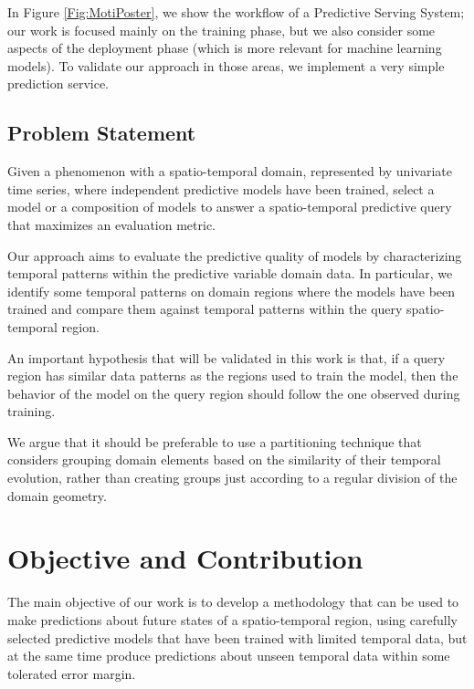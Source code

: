 In Figure \ref{Fig:MotiPoster}, we show the workflow of a Predictive Serving System; our work is focused mainly on the training phase, but we also consider some aspects of the deployment phase (which is more relevant for machine learning models). To validate our approach in those areas, we implement a very simple prediction service.


\subsection{Problem Statement}
\label{Sec:ProblemStatement}

Given a phenomenon with a spatio-temporal domain, represented by univariate time series, where independent predictive models have been trained, select a model or a composition of models to answer a spatio-temporal predictive query that maximizes an evaluation metric.

Our approach aims to evaluate the predictive quality of models by characterizing temporal patterns within the predictive variable domain data. In particular, we identify some temporal patterns on domain regions where the models have been trained and compare them against temporal patterns within the query spatio-temporal region. 

An important hypothesis that will be validated in this work is that, if a query region has similar data patterns as the regions used to train the model, then the behavior of the model on the query region should follow the one observed during training.

We argue that it should be preferable to use a partitioning technique that considers grouping domain elements based on the similarity of their temporal evolution, rather than creating groups just according to a regular division of the domain geometry.

\section{Objective and Contribution}
\label{Sec:ObjectiveContribution}

The main objective of our work is to develop a methodology that can be used to make predictions about future states of a spatio-temporal region, using carefully selected predictive models that have been trained with limited temporal data, but at the same time produce predictions about unseen temporal data within some tolerated error margin. 

